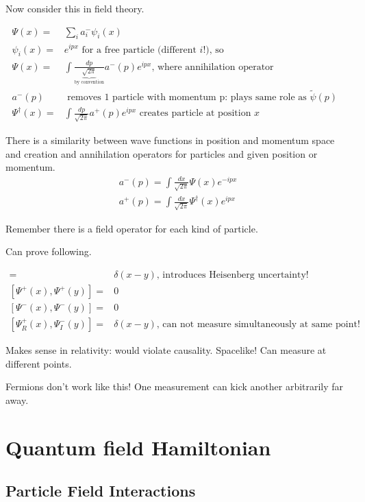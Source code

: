 \documentclass[]{article}
\begin{document}
Now consider this in field theory.

\begin{align*}
\Psi(x) =& \sum_{i} a^-_i \psi_i(x)\\
\psi_i(x) =& e^{ipx} \text{ for a free particle (different $i$!), so} \\
\Psi(x)=& \int \frac{dp}{\underbrace{\sqrt{2\pi}}_\text{by convention}} a^-(p) e^{ipx} \text{, where annihilation operator}\\
a^-(p)& \text{ removes 1 particle with momentum p: plays same role as $\widetilde{\psi}(p)$ }\\
\Psi^\dagger(x)=& \int \frac{dp}{\sqrt{2\pi}} a^+(p) e^{ipx} \text{ creates particle at position $x$}
\end{align*}

There is a similarity between wave functions in position and momentum space and creation and annihilation operators for particles and given position or momentum.
\begin{align*}
a^-(p) = \int \frac{dx}{\sqrt{2\pi}} \Psi(x) e^{-ipx}\\
a^+(p) = \int \frac{dx}{\sqrt{2\pi}} \Psi^\dagger(x) e^{ipx}
\end{align*}

Remember there is a field operator for each kind of particle.

Can prove following.
 
\begin{align*}
[\Psi^+(x),\Psi^-(y)] =& \delta(x-y) \text{, introduces Heisenberg uncertainty!}\\
[\Psi^+(x),\Psi^+(y)] =&0\\
[\Psi^-(x),\Psi^-(y)] =&0\\
[\Psi^+_R(x),\Psi^-_I(y)] =& \delta(x-y) \text{, can not measure simultaneously at same point!}
\end{align*}

Makes sense in relativity: would violate causality. Spacelike! Can measure at different points.

Fermions don't work like this! One measurement can kick another arbitrarily far away.

\section{Quantum field Hamiltonian}

\subsection{Particle Field Interactions}
\end{document}
